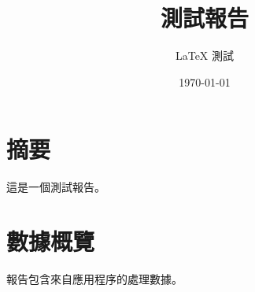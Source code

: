 \documentclass{article}
\title{測試報告}
\author{LaTeX 測試}
\date{\today}
\begin{document}
\maketitle
\section{摘要}
這是一個測試報告。
\section{數據概覽}
報告包含來自應用程序的處理數據。
\end{document}
